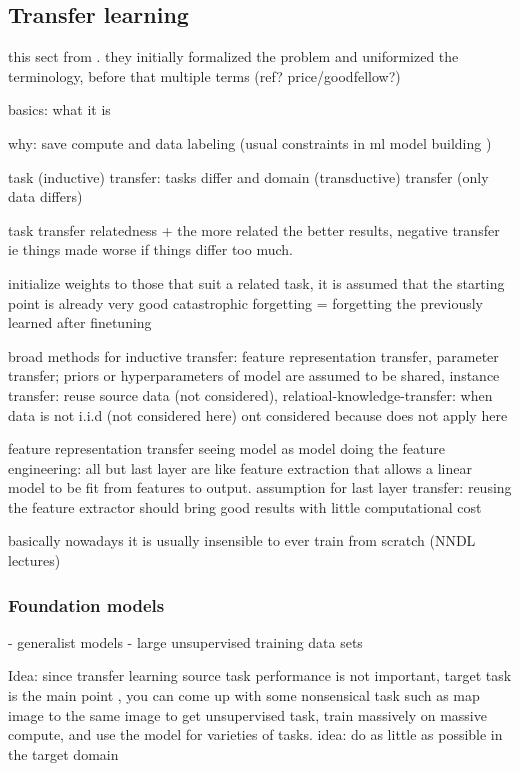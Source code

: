 \documentclass{article}
\begin{document}
\subsection{Transfer learning}

this sect from \cite{transferlearning_survey}. they initially formalized the problem and uniformized 
the terminology, before that multiple terms (ref? price/goodfellow?)

basics: what it is 

why: save compute and data labeling (usual constraints in ml model building \cite{engbook})

task (inductive) transfer: tasks differ and domain (transductive) transfer (only data differs)

task transfer relatedness + the more related the better results, negative transfer ie things made worse if 
things differ too much.

initialize weights to those that suit a related task, it is assumed that the starting point is already very good
catastrophic forgetting = forgetting the previously learned after finetuning

broad methods for inductive transfer: feature representation transfer, parameter transfer; priors or hyperparameters of model are assumed to be shared,
instance transfer: reuse source data (not considered), relatioal-knowledge-transfer: when data is not i.i.d (not considered here)
ont considered because does not apply here

feature representation transfer
seeing model as model doing the feature engineering: all but last layer are like 
feature extraction that allows a linear model to be fit from features to output. 
assumption for last layer transfer: reusing the feature extractor should bring good results with little computational cost

basically nowadays it is usually insensible to ever train from scratch (NNDL lectures)


\subsubsection{Foundation models}

- generalist models
	- large unsupervised training data sets

Idea: since transfer learning source task performance is not important, target task is the main point \cite{transferlearning_survey}, 
you can come up with some nonsensical task such as map image to the same image to get unsupervised task, train 
massively on massive compute, and use the model for varieties of tasks. idea: do as little as possible in the target domain
\end{document}
